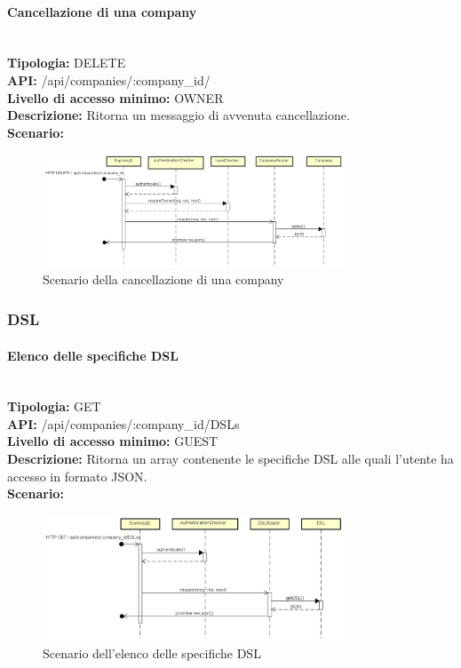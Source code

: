 \newpage
\paragraph{Cancellazione di una company}\mbox{}\\
\textbf{Tipologia:} DELETE \\
\textbf{API:} /api/companies/:company\_id/ \\
\textbf{Livello di accesso minimo:} OWNER \\
\textbf{Descrizione:} Ritorna un messaggio di avvenuta cancellazione. \\
\textbf{Scenario:} 
\begin{figure}[H]
\centering
\includegraphics[width=0.8\textwidth]{res/sections/backend/sequence/(DELETE)company.png}
\caption{Scenario della cancellazione di una company}
\end{figure}

\newpage
\subsubsection{DSL}
\paragraph{Elenco delle specifiche DSL}\mbox{}\\
\textbf{Tipologia:} GET \\
\textbf{API:} /api/companies/:company\_id/DSLs \\
\textbf{Livello di accesso minimo:} GUEST \\
\textbf{Descrizione:} Ritorna un array contenente le specifiche DSL alle quali l'utente ha accesso in formato JSON. \\
\textbf{Scenario:} 
\begin{figure}[H]
\centering
\includegraphics[width=0.8\textwidth]{res/sections/backend/sequence/(GET)dsl.png}
\caption{Scenario dell'elenco delle specifiche DSL}
\end{figure}

